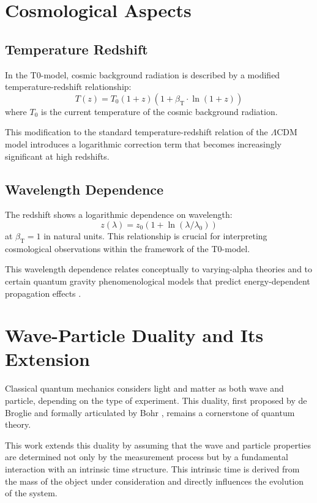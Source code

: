 \documentclass[a4paper,12pt]{article}
\newcommand{\betaT}{\beta_{\text{T}}}
\newcommand{\LCDM}{\Lambda\text{CDM}}
\begin{document}
	\section{Cosmological Aspects}
	
	\subsection{Temperature Redshift}
	In the T0-model, cosmic background radiation is described by a modified temperature-redshift relationship:
	\[
	T(z) = T_0 (1+z)(1+\betaT \cdot \ln(1+z))
	\]
	where $T_0$ is the current temperature of the cosmic background radiation.
	
	This modification to the standard temperature-redshift relation of the $\LCDM{}$ model \cite{Peebles2003} introduces a logarithmic correction term that becomes increasingly significant at high redshifts.
	
	\subsection{Wavelength Dependence}
	The redshift shows a logarithmic dependence on wavelength:
	\[
	z(\lambda) = z_0(1+\ln(\lambda/\lambda_0))
	\]
	at $\betaT = 1$ in natural units. This relationship is crucial for interpreting cosmological observations within the framework of the T0-model.
	
	This wavelength dependence relates conceptually to varying-alpha theories \cite{Webb1999} and to certain quantum gravity phenomenological models that predict energy-dependent propagation effects \cite{AmelinoCamelia1998}.
	
	\section{Wave-Particle Duality and Its Extension}
	
	Classical quantum mechanics considers light and matter as both wave and particle, depending on the type of experiment. This duality, first proposed by de Broglie \cite{deBroglie1923} and formally articulated by Bohr \cite{Bohr1928}, remains a cornerstone of quantum theory.
	
	This work extends this duality by assuming that the wave and particle properties are determined not only by the measurement process but by a fundamental interaction with an intrinsic time structure. This intrinsic time is derived from the mass of the object under consideration and directly influences the evolution of the system.
	
\end{document}
